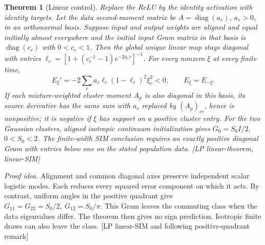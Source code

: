\documentclass[10pt,twocolumn]{article}
\newtheorem{theorem}{Theorem}
\newcommand{\idea}{\par\noindent\emph{Proof idea.} }
\newcommand{\src}[1]{\textnormal{\small [#1]}}
\begin{document}
\begin{theorem}[Linear control]\label{p1thv1:linear}
Replace the ReLU by the identity activation with identity targets.
Let the data second-moment matrix be \(A=\operatorname{diag}(a_r)\),
\(a_r>0\), in an orthonormal basis. Suppose input and output weights
are aligned and equal initially almost everywhere and the initial
input Gram matrix in that basis is \(\operatorname{diag}(c_r)\)
with \(0<c_r<1\). Then the global unique linear map stays diagonal
with entries \(\ell_r=[1+(c_r^{-1}-1)e^{-2a_r\tau}]^{-1}\).
For every nonzero \(\xi\) at every finite time,
\[
 E_\xi'=-2\sum_r a_r\ell_r(1-\ell_r)^2\xi_r^2<0,
 \qquad E_{\xi}=E_{-\xi}.
\]
If each mixture-weighted cluster moment \(A_p\) is also diagonal
in this basis, its source derivative has the same sum with
\(a_r\) replaced by \((A_p)_{rr}\), hence is nonpositive; it is
negative if \(\xi\) has support on a positive cluster entry.
For the two Gaussian clusters, aligned isotropic continuum
initialization gives \(G_0=S_0I/2\), \(0<S_0<2\).
The finite-width SIM conclusion requires an exactly positive diagonal
Gram with entries below one on the stated population data.
\src{LP linear-theorem, linear-SIM}
\end{theorem}
\idea Alignment and common diagonal axes preserve independent scalar
logistic modes. Each reduces every squared error component on which it
acts. By contrast, uniform angles in the positive quadrant give
\(G_{11}=G_{22}=S_0/2,\ G_{12}=S_0/\pi\). This Gram leaves the
commuting class when the data eigenvalues differ. The theorem then
gives no sign prediction. Isotropic finite draws can also leave the
class. \src{LP linear-SIM and following positive-quadrant remark}
\end{document}
